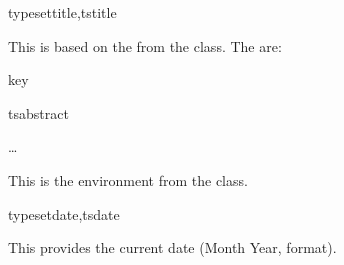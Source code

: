\documentclass{article}
\begin{document}
\begin{codedescribe}[code]{typesettitle,tstitle}
\begin{codesyntax}
\end{codesyntax}
This is based on the \tsobj[code]{\maketitle} from the  class. The  are:
\end{codedescribe}

\begin{describelist}{key}
\end{describelist}

\begin{codedescribe}[env]{tsabstract}
\begin{codesyntax}
\tsmacro{\begin{tsabstract}}{}
\ldots
\tsmacro{\end{tsabstract}}{}
\end{codesyntax}
This is the  environment from the  class.
\end{codedescribe}

\begin{codedescribe}[code,new=2023/05/16]{typesetdate,tsdate}
\begin{codesyntax}
\tsmacro{\typesetdate}{}
\tsmacro{\tsdate}{}
\end{codesyntax}
This provides the current date (Month Year, format).
\end{codedescribe}
\end{document}
